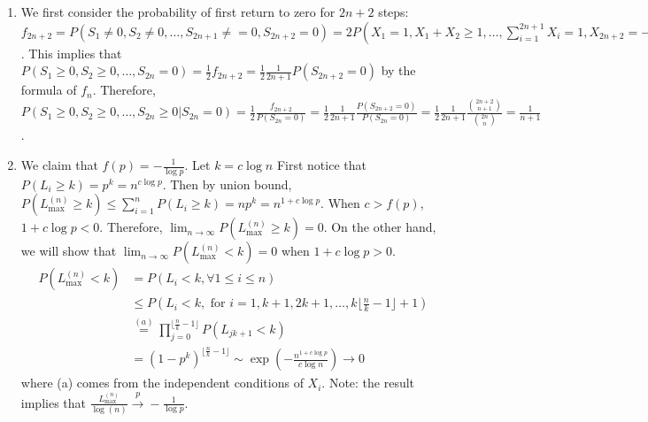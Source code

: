 \documentclass{article}
\begin{document}
\courseheader
{}

\begin{enumerate}
\item We first consider the probability
of first return to zero for $2n+2$ steps:
$f_{2n+2}=P(S_1\neq 0, S_2\neq 0, \dots, S_{2n+1}\neq =0,
S_{2n+2}=0)=2P(X_1=1,X_1+X_2\geq 1,\dots, \sum_{i=1}^{2n+1}X_i=1,X_{2n+2}=-1)=2P(S_1\geq 0,
S_2\geq 0,\dots, S_{2n}=0)$.
This implies that $P(S_1\geq 0,
S_2\geq 0,\dots, S_{2n}=0)=\frac{1}{2}f_{2n+2}
=\frac{1}{2}\frac{1}{2n+1}P(S_{2n+2}=0)$ by the formula of $f_{n}$.
Therefore,
$P(S_1\geq 0,
S_2\geq 0,\dots,S_{2n}\geq 0| S_{2n}=0)
=\frac{1}{2}\frac{f_{2n+2}}{P(S_{2n}=0)}
=\frac{1}{2}\frac{1}{2n+1}\frac{P(S_{2n+2}=0)}{P(S_{2n}=0)}=\frac{1}{2}\frac{1}{2n+1}\frac{\binom{2n+2}{n+1}}{\binom{2n}{n}}=\frac{1}{n+1}$.
\item We claim that $f(p)=-\frac{1}{\log p}$.
Let $k=c\log n$
First notice that $P(L_i \geq k) = p^k = n^{c\log p}$. Then by union bound,
$P(L^{(n)}_{\max} \geq k)
\leq \sum_{i=1}^n P(L_i \geq k)=np^k=n^{1+c\log p}$.
When $c>f(p)$, $1+c\log p < 0$. Therefore,
$\lim_{n\to\infty}P(L^{(n)}_{\max} \geq k) = 0$.
On the other hand, we will show that
$\lim_{n\to\infty}P(L^{(n)}_{\max} < k) = 0$
when $1+c\log p >0$.
\begin{align*}
    P(L^{(n)}_{\max} < k) &= 
    P(L_i < k, \forall 1\leq i \leq n)
    \\
    &\leq P(L_i <k, \textrm{ for } i=1,k+1,2k+1,
    \dots, k\lfloor \frac{n}{k} - 1\rfloor +1)\\
    &\stackrel{(a)}{=}\prod_{j=0}^{\lfloor \frac{n}{k} - 1\rfloor}P(L_{jk+1} < k) \\
    &=(1-p^k)^{\lfloor \frac{n}{k} - 1\rfloor} 
    \sim \exp(-\frac{n^{1+c\log p}}{c\log n})
    \to 0
\end{align*}
where (a) comes from the independent conditions
of $X_i$. Note: the result implies that
$\frac{L^{(n)}_{\max}}{\log (n)} \xrightarrow{p} -\frac{1}{\log p}$.


\end{enumerate}
\end{document}
